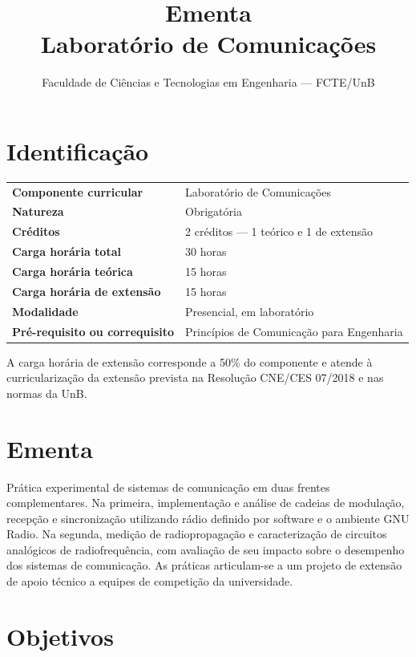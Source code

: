 \documentclass[11pt,a4paper]{article}
\title{\textbf{Ementa}\\[0.3em]\large Laboratório de Comunicações}
\author{Faculdade de Ciências e Tecnologias em Engenharia --- FCTE/UnB}
\date{}
\begin{document}
\thispagestyle{plain}
\maketitle
\vspace{-1.0em}

\section{Identificação}

\begin{center}
\small
\begin{tabular}{@{}p{} p{}@{}}
\toprule
\textbf{Componente curricular} & Laboratório de Comunicações \\
\textbf{Natureza} & Obrigatória \\
\textbf{Créditos} & 2 créditos --- 1 teórico e 1 de extensão \\
\textbf{Carga horária total} & 30 horas \\
\textbf{Carga horária teórica} & 15 horas \\
\textbf{Carga horária de extensão} & 15 horas \\
\textbf{Modalidade} & Presencial, em laboratório \\
\textbf{Pré-requisito ou correquisito} & Princípios de Comunicação para Engenharia \\
\bottomrule
\end{tabular}
\end{center}

A carga horária de extensão corresponde a 50\% do componente e atende à curricularização da extensão prevista na Resolução CNE/CES 07/2018 e nas normas da UnB.

\section{Ementa}

Prática experimental de sistemas de comunicação em duas frentes complementares. Na primeira, implementação e análise de cadeias de modulação, recepção e sincronização utilizando rádio definido por software e o ambiente GNU Radio. Na segunda, medição de radiopropagação e caracterização de circuitos analógicos de radiofrequência, com avaliação de seu impacto sobre o desempenho dos sistemas de comunicação. As práticas articulam-se a um projeto de extensão de apoio técnico a equipes de competição da universidade.

\section{Objetivos}
\end{document}
